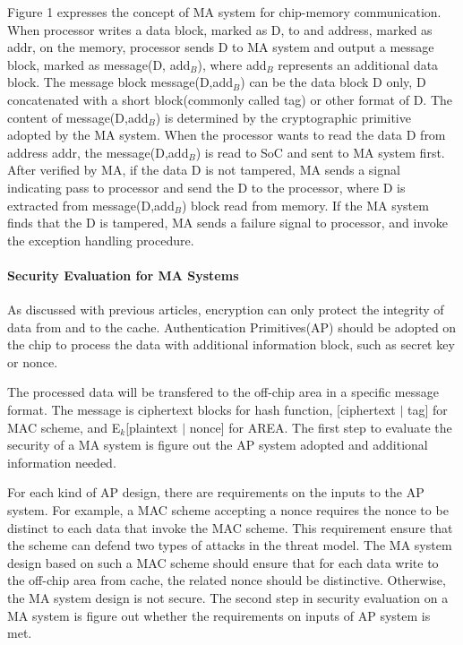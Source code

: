 \documentclass{article}
\begin{document}
Figure 1 expresses the concept of MA system for chip-memory communication. 
When processor writes a data block, marked as D, to and address, marked as addr, on the memory, processor sends D to MA system and output a message block, marked as message(D, add$_B$), where add$_B$ represents an additional data block. The message block message(D,add$_B$) can be the data block D only, D concatenated with a short block(commonly called tag) or other format of D. The content of message(D,add$_B$) is determined by the cryptographic primitive adopted by the MA system.
When the processor wants to read the data D from address addr, the message(D,add$_B$) is read to SoC and sent to MA system first. After verified by MA, if the data D is not tampered, MA sends a signal indicating pass to processor and send the D to the processor, where D is extracted from message(D,add$_B$) block read from memory.
If the MA system finds that the D is tampered, MA sends a failure signal to processor, and invoke the exception handling procedure.

\paragraph{Security Evaluation for MA Systems}
As discussed with previous articles, encryption can only protect the integrity of data from and to the cache. Authentication Primitives(AP) should be adopted on the chip to process the data with additional information block, such as secret key or nonce. 

The processed data will be transfered to the off-chip area in a specific message format. The message is ciphertext blocks for hash function, [ciphertext $\mid$ tag] for MAC scheme, and E$_k$[plaintext $\mid$ nonce] for AREA. The first step to evaluate the security of a MA system is figure out the AP system adopted and additional information needed. 

For each kind of AP design, there are requirements on the inputs to the AP system. For example, a MAC scheme accepting a nonce requires the nonce to be distinct to each data that invoke the MAC scheme. This requirement ensure that the scheme can defend two types of attacks in the threat model. The MA system design based on such a MAC scheme should ensure that for each data write to the off-chip area from cache, the related nonce should be distinctive. Otherwise, the MA system design is not secure. The second step in security evaluation on a MA system is figure out whether the requirements on inputs of AP system is met.
\end{document}
